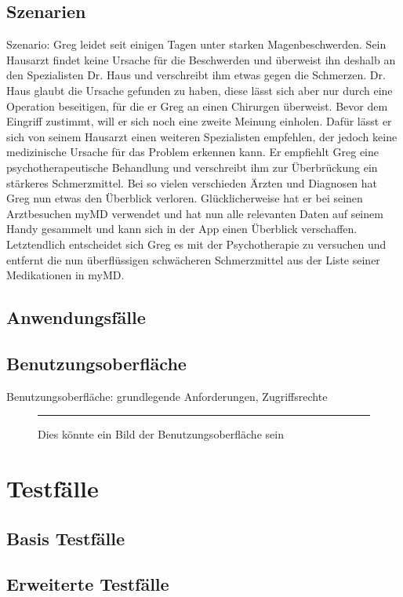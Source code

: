 \documentclass[a4paper]{scrreprt}
\begin{document}
\section{Szenarien}
Szenario: Greg leidet seit einigen Tagen unter starken Magenbeschwerden. Sein Hausarzt findet keine Ursache für die Beschwerden und überweist ihn deshalb an den Spezialisten Dr. Haus und verschreibt ihm etwas gegen die Schmerzen. Dr. Haus glaubt die Ursache gefunden zu haben, diese lässt sich aber nur durch eine Operation beseitigen, für die er Greg an einen Chirurgen überweist. Bevor dem Eingriff zustimmt, will er sich noch eine zweite Meinung einholen. Dafür lässt er sich von seinem Hausarzt einen weiteren Spezialisten empfehlen, der jedoch keine medizinische Ursache für das Problem erkennen kann. Er empfiehlt Greg eine psychotherapeutische Behandlung und verschreibt ihm zur Überbrückung ein stärkeres Schmerzmittel. Bei so vielen verschieden Ärzten und Diagnosen hat Greg nun etwas den Überblick verloren. Glücklicherweise hat er bei seinen Arztbesuchen myMD verwendet und hat nun alle relevanten Daten auf seinem Handy gesammelt und kann sich in der App einen Überblick verschaffen. Letztendlich entscheidet sich Greg es mit der Psychotherapie zu versuchen und entfernt die nun überflüssigen schwächeren Schmerzmittel aus der Liste seiner Medikationen in myMD.

\section{Anwendungsfälle}
\section{Benutzungsoberfläche}
Benutzungsoberfläche: grundlegende Anforderungen, Zugriffsrechte
 
\begin{figure}[ht]
  \centering
  \rule{8cm}{6cm}
  \caption{Dies könnte ein Bild der Benutzungsoberfläche sein}
\end{figure}

\chapter{Testfälle}
\section{Basis Testfälle}
\section{Erweiterte Testfälle}
\end{document}
